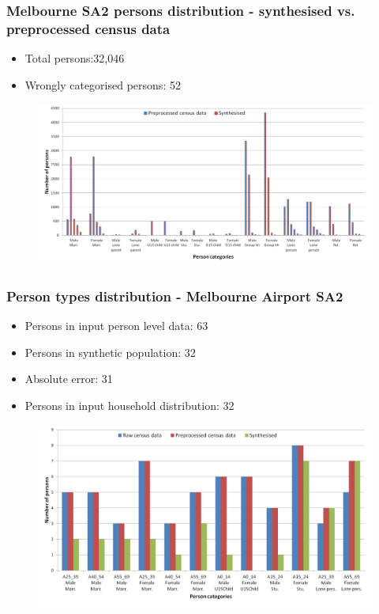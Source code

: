\begin{frame}
  \frametitle{Melbourne SA2  persons distribution - synthesised vs. 
  preprocessed 
  census data}
  \begin{itemize}
    \item Total persons:32,046
    \item Wrongly categorised persons: 52
  \end{itemize}
  \vspace{-3em}
  \begin{figure}%
    \includegraphics[trim={0.58cm
      0 0 0},clip,scale=0.43] 
    {images/good-melb-person-bar}
  \end{figure}%
  
\end{frame}%

\begin{frame}
  \frametitle{Person types distribution - Melbourne Airport SA2}
  \begin{itemize}
    \item Persons in input person level data: 63
\item Persons in synthetic population: 32
\item Absolute error: 31
\item Persons in input household distribution: 32
  \end{itemize}
    \vspace{-2em}
  \begin{figure}%
    \includegraphics[trim={0.5cm
      0 0 0},clip,scale=0.45] {images/melb-airport-person-bar}
  \end{figure}%
  
\end{frame}%

